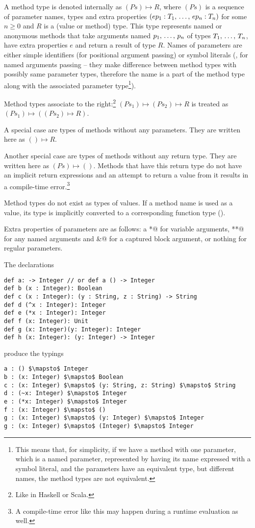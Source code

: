 A method type is denoted internally as $(Ps) \mapsto R$, where $(Ps)$ is a sequence of parameter names, types and extra properties $(ep_1 : T_1 ,\, \ldots ,\, ep_n : T_n)$ for some $n \geq 0$ and $R$ is a (value or method) type. This type represents named or anonymous methods that take arguments named $p_1 ,\, \ldots ,\, p_n$ of types $T_1 ,\, \ldots ,\, T_n$, have extra properties $e$ and return a result of type $R$. Names of parameters are either simple identifiers (for positional argument passing) or symbol literals (, for named arguments passing -- they make difference between method types with possibly same parameter types, therefore the name is a part of the method type along with the associated parameter type\footnote{This means that, for simplicity, if we have a method with one parameter, which is a named parameter, represented by having its name expressed with a symbol literal, and the parameters have an equivalent type, but different names, the method types are not equivalent.}). 

Method types associate to the right:\footnote{Like in Haskell or Scala.} \newline
$(Ps_1) \mapsto (Ps_2) \mapsto R$ is treated as $(Ps_1) \mapsto ((Ps_2) \mapsto R)$. 

A special case are types of methods without any parameters. They are written here as $() \mapsto R$. 

Another special case are types of methods without any return type. They are written here as $(Ps) \mapsto ()$. Methods that have this return type do not have an implicit return expressions and an attempt to return a value from it results in a compile-time error.\footnote{A compile-time error like this may happen during a runtime evaluation as well.}

Method types do not exist as types of values. If a method name is used as a value, its type is implicitly converted to a corresponding function type (). 

Extra properties of parameters are as follows: a \lstinline@*@ for variable arguments, \lstinline@**@ for any named arguments and \lstinline@&@ for a captured block argument, or nothing for regular parameters. 

\example The declarations
\begin{lstlisting}
def a: -> Integer // or def a () -> Integer
def b (x : Integer): Boolean
def c (x : Integer): (y : String, z : String) -> String
def d (^x : Integer): Integer
def e (*x : Integer): Integer
def f (x: Integer): Unit
def g (x: Integer)(y: Integer): Integer
def h (x: Integer): (y: Integer) -> Integer
\end{lstlisting}
produce the typings
\begin{lstlisting}
a : () $\mapsto$ Integer
b : (x: Integer) $\mapsto$ Boolean
c : (x: Integer) $\mapsto$ (y: String, z: String) $\mapsto$ String
d : (~x: Integer) $\mapsto$ Integer
e : (*x: Integer) $\mapsto$ Integer
f : (x: Integer) $\mapsto$ ()
g : (x: Integer) $\mapsto$ (y: Integer) $\mapsto$ Integer
g : (x: Integer) $\mapsto$ (Integer) $\mapsto$ Integer
\end{lstlisting}

